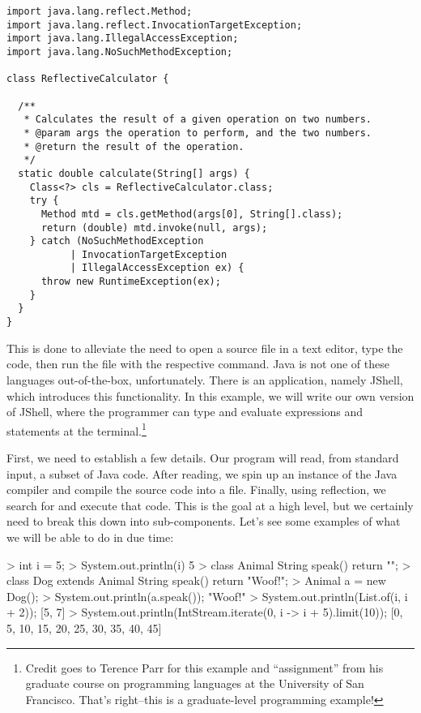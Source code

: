 \begin{lstlisting}[language=MyJava]
import java.lang.reflect.Method;
import java.lang.reflect.InvocationTargetException;
import java.lang.IllegalAccessException;
import java.lang.NoSuchMethodException;

class ReflectiveCalculator {

  /**
   * Calculates the result of a given operation on two numbers.
   * @param args the operation to perform, and the two numbers.
   * @return the result of the operation.
   */
  static double calculate(String[] args) {
    Class<?> cls = ReflectiveCalculator.class;
    try {
      Method mtd = cls.getMethod(args[0], String[].class);
      return (double) mtd.invoke(null, args);
    } catch (NoSuchMethodException
           | InvocationTargetException
           | IllegalAccessException ex) {
      throw new RuntimeException(ex);
    }
  }
}
\end{lstlisting}

This is done to alleviate the need to open a source file in a text editor, type the code, then run the file with the respective command. 
Java is not one of these languages out-of-the-box, unfortunately. 
There is an application, namely JShell, which introduces this functionality. 
In this example, we will write our own version of JShell, where the programmer can type and evaluate expressions and statements at the terminal.\footnote{Credit goes to Terence Parr for this example and ``assignment'' from his graduate course on programming languages at the University of San Francisco. That's right--this is a graduate-level programming example!}

First, we need to establish a few details. 
Our program will read, from standard input, a subset of Java code. 
After reading, we spin up an instance of the Java compiler and compile the source code into a  file. 
Finally, using reflection, we search for and execute that code. 
This is the goal at a high level, but we certainly need to break this down into sub-components. 
Let's see some examples of what we will be able to do in due time:

\begin{verbnobox}[\small]
> int i = 5;
> System.out.println(i)
5
> class Animal { String speak() { return ""; }}
> class Dog extends Animal { String speak() { return "Woof!"; }}
> Animal a = new Dog();
> System.out.println(a.speak());
"Woof!"
> System.out.println(List.of(i, i + 2));
[5, 7]
> System.out.println(IntStream.iterate(0, i -> i + 5).limit(10));
[0, 5, 10, 15, 20, 25, 30, 35, 40, 45]
\end{verbnobox}

